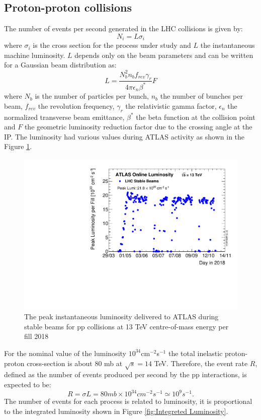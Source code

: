 \documentclass[a4paper, oneside, 11pt, openright]{book}
\begin{document}
				\subsection{Proton-proton collisions}
					The number of events per second generated in the LHC collisions is given by:
					$$
					N_{i} = L\sigma_{i}
					$$
					where $\sigma_{i}$ is the cross section for the process under study and $L$ the instantaneous machine luminosity. $L$ depends only on the beam parameters and can be written for a Gaussian beam distribution as: 
					$$
					L = \frac{N_b^2n_bf_{rev}\gamma_r}{4\pi\epsilon_n\beta^*}F
					$$
					where $N_b$ is the number of particles per bunch, $n_b$ the number of bunches per beam, $f_{rev}$ the revolution frequency, $\gamma_r$ the relativistic gamma factor, $\epsilon_n$ the normalized transverse beam emittance, $\beta^*$ the beta function at the collision point and $F$ the geometric luminosity reduction factor due to the crossing angle at the IP. The luminosity had various values during ATLAS activity as shown in the Figure \ref{fig:lum}.
					
					\begin{figure}
						\centering
						\includegraphics[width=0.5\textheight]{tesi_images/insta_lum_2018.pdf}
						\caption{The peak instantaneous luminosity delivered to ATLAS during stable beams for pp collisions at 13 TeV centre-of-mass energy per fill 2018}
						\label{fig:lum}
					\end{figure}
					
					For the nominal value of the luminosity $10^{34}$cm$^{-2}$s$^{-1}$ the total inelastic proton-proton cross-section is about 80 mb \cite{LHC introduction}  at $\sqrt{s} = 14$ TeV. Therefore, the event rate $R$, defined as the number of events produced per second by the pp interactions, is expected to be:
					$$
					R = \sigma L = 80 mb\times10^{34}cm^{-2}s^{-1} \simeq 10^{9}s^{-1}.
					$$ 
					The number of events for each process is related to luminosity, it is proportional to the integrated luminosity shown in Figure \ref{fig:Integreted Luminosity}.
					
\end{document}
